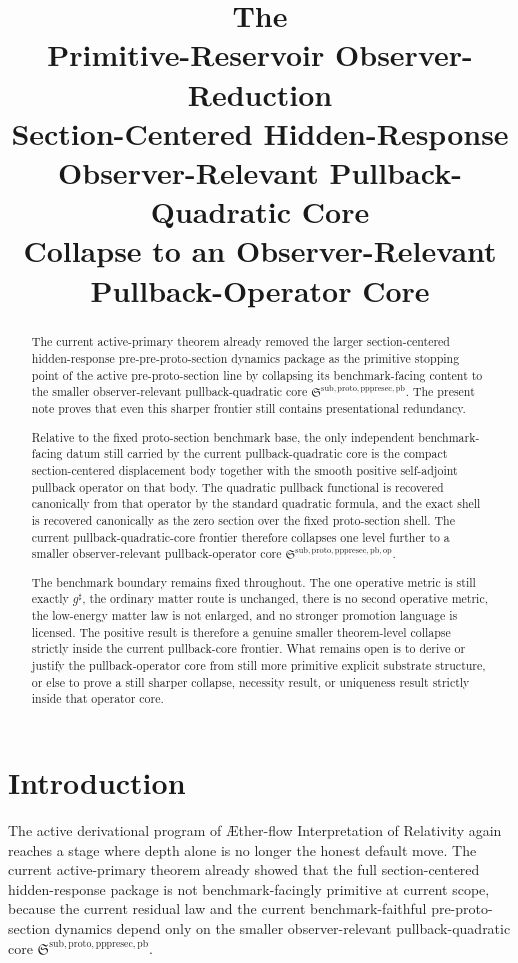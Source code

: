 \documentclass[11pt]{article}
\title{\textbf{The \TheoryName{}}\\[0.4em]
\large Primitive-Reservoir Observer-Reduction\\
\large Section-Centered Hidden-Response\\
\large Observer-Relevant Pullback-Quadratic Core\\
\large Collapse to an Observer-Relevant Pullback-Operator Core}
\author{}
\date{}
\newcommand{\Aflow}{\AE{}ther-flow}
\newcommand{\TheoryName}{\Aflow{} Interpretation of Relativity}
\newcommand{\CompletedMetric}{g^{\sharp}}
\newcommand{\PrePreProtoSectionPullbackCore}{\mathfrak S^{\mathrm{sub,proto,pppresec,pb}}}
\newcommand{\PullbackOperatorCore}{\mathfrak S^{\mathrm{sub,proto,pppresec,pb,op}}}
\begin{document}
\maketitle

\begin{abstract}
The current active-primary theorem already removed the larger section-centered hidden-response pre-pre-proto-section dynamics package as the primitive stopping point of the active pre-proto-section line by collapsing its benchmark-facing content to the smaller observer-relevant pullback-quadratic core \(\PrePreProtoSectionPullbackCore\). The present note proves that even this sharper frontier still contains presentational redundancy.

Relative to the fixed proto-section benchmark base, the only independent benchmark-facing datum still carried by the current pullback-quadratic core is the compact section-centered displacement body together with the smooth positive self-adjoint pullback operator on that body. The quadratic pullback functional is recovered canonically from that operator by the standard quadratic formula, and the exact shell is recovered canonically as the zero section over the fixed proto-section shell. The current pullback-quadratic-core frontier therefore collapses one level further to a smaller observer-relevant pullback-operator core \(\PullbackOperatorCore\).

The benchmark boundary remains fixed throughout. The one operative metric is still exactly \(\CompletedMetric\), the ordinary matter route is unchanged, there is no second operative metric, the low-energy matter law is not enlarged, and no stronger promotion language is licensed. The positive result is therefore a genuine smaller theorem-level collapse strictly inside the current pullback-core frontier. What remains open is to derive or justify the pullback-operator core from still more primitive explicit substrate structure, or else to prove a still sharper collapse, necessity result, or uniqueness result strictly inside that operator core.
\end{abstract}

\section{Introduction}

The active derivational program of \TheoryName{} again reaches a stage where depth alone is no longer the honest default move. The current active-primary theorem already showed that the full section-centered hidden-response package is not benchmark-facingly primitive at current scope, because the current residual law and the current benchmark-faithful pre-proto-section dynamics depend only on the smaller observer-relevant pullback-quadratic core \(\PrePreProtoSectionPullbackCore\).
\end{document}
